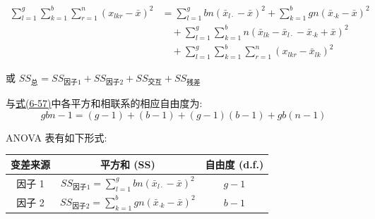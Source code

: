 \label{eq:6-57}
\begin{equation}
\begin{aligned}
\sum_{l=1}^{g}\sum_{k=1}^{b}\sum_{r=1}^{n}(x_{lkr}-\bar{x})^2
&= \sum_{l=1}^{g} bn(\bar{x}_{l\cdot}-\bar{x})^2 + \sum_{k=1}^{b} gn(\bar{x}_{\cdot k}-\bar{x})^2 \\
&\quad + \sum_{l=1}^{g}\sum_{k=1}^{b} n(\bar{x}_{lk}-\bar{x}_{l\cdot}-\bar{x}_{\cdot k}+\bar{x})^2 \\
&\quad + \sum_{l=1}^{g}\sum_{k=1}^{b}\sum_{r=1}^{n}(x_{lkr}-\bar{x}_{lk})^2
\end{aligned}
\tag{6-57}
\end{equation}

或 \quad $SS_{总}=SS_{因子1}+SS_{因子2}+SS_{交互}+SS_{残差}$

与\hyperref[eq:6-57]{式(6-57)}中各平方和相联系的相应自由度为:
\label{eq:6-58}
\begin{equation}
gbn-1 = (g-1)+(b-1)+(g-1)(b-1)+gb(n-1) \tag{6-58}
\end{equation}

ANOVA 表有如下形式:

\begin{mvtable}
\begin{tabular}{@{}ccc@{}}
\toprule
变差来源 & 平方和 (SS) & 自由度 (d.f.)\\
\midrule
因子 1 & $SS_{因子1}=\sum\limits_{l=1}^{g} bn(\bar{x}_{l\cdot}-\bar{x})^2$ & $g-1$\\[8pt]
因子 2 & $SS_{因子2}=\sum\limits_{k=1}^{b} gn(\bar{x}_{\cdot k}-\bar{x})^2$ & $b-1$\\
\bottomrule
\end{tabular}
\end{mvtable}
